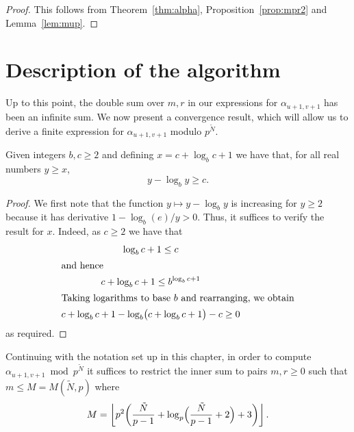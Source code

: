 \begin{proof}
This follows from Theorem~\ref{thm:alpha}, Proposition~\ref{prop:mpr2} 
and Lemma~\ref{lem:mup}.
\end{proof}


\section{Description of the algorithm}

Up to this point, the double sum over $m,r$ in our expressions 
for $\alpha_{u+1,v+1}$ has been an infinite sum.  We now present 
a convergence result, which will allow us to derive a finite 
expression for $\alpha_{u+1,v+1}$ modulo $p^{\tilde{N}}$.

\begin{lem} \label{lem:log}
Given integers $b,c \geq 2$ and defining $x = c + \log_b c + 1$ 
we have that, for all real numbers $y \geq x$, 
\begin{equation*}
y - \log_b y \geq c.
\end{equation*}
\end{lem}

\begin{proof}
We first note that the function $y \mapsto y - \log_b y$ is increasing 
for $y \geq 2$ because it has derivative $1 - \log_b(e)/y > 0$.  Thus, it 
suffices to verify the result for $x$.  Indeed, as $c \geq 2$ we have 
that 
\begin{gather*}
\log_b c + 1 \leq c \\
\intertext{and hence}
c + \log_b c + 1 \leq b^{\log_b c + 1} \\
\intertext{Taking logarithms to base $b$ and rearranging, we obtain}
c + \log_b c + 1 - \log_b \bigl(c + \log_b c + 1\bigr) - c \geq 0
\end{gather*}
as required.
\end{proof}

\begin{prop}
Continuing with the notation set up in this chapter, in order to compute 
$\alpha_{u+1,v+1} \bmod p^{\tilde{N}}$ it suffices to restrict the inner 
sum to pairs $m,r \geq 0$ such that $m \leq M = M(\tilde{N}, p)$ where 
\begin{equation*}
M = \left\lfloor p^2 \biggl( \frac{\tilde{N}}{p-1} 
            + \log_p\Bigl(\frac{\tilde{N}}{p-1} + 2\Bigr) + 3 \biggr) \right\rfloor.
\end{equation*}
\end{prop}

